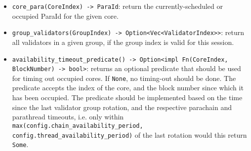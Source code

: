 \begin{itemize}
    \item \verb|core_para(CoreIndex) -> ParaId|: return the currently-scheduled or
    occupied ParaId for the given core.
    \item \verb|group_validators(GroupIndex) -> Option<Vec<ValidatorIndex>>|: return
    all validators in a given group, if the group index is valid for this
    session.
    \item \verb|availability_timeout_predicate() -> Option<impl Fn(CoreIndex,|
    \verb|BlockNumber) -> bool>|: returns an optional predicate that should be used for
    timing out occupied cores. If \verb|None|, no timing-out should be done. The
    predicate accepts the index of the core, and the block number since which it
    has been occupied. The predicate should be implemented based on the time
    since the last validator group rotation, and the respective parachain and
    parathread timeouts, i.e. only within \verb|max(config.chain_availability_period,|
    \newline
    \verb|config.thread_availability_period)| of the last rotation would this return
    \verb|Some|.
\end{itemize}

